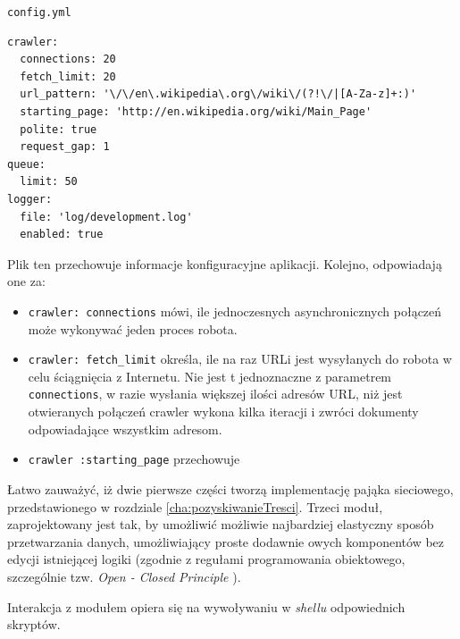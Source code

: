 \texttt{config.yml}

\lstset{language=ruby}
\begin{lstlisting}[frame=single]
crawler:
  connections: 20
  fetch_limit: 20
  url_pattern: '\/\/en\.wikipedia\.org\/wiki\/(?!\/|[A-Za-z]+:)'
  starting_page: 'http://en.wikipedia.org/wiki/Main_Page'
  polite: true
  request_gap: 1
queue:
  limit: 50
logger:
  file: 'log/development.log'
  enabled: true

\end{lstlisting}

Plik ten przechowuje informacje konfiguracyjne aplikacji. Kolejno, odpowiadają one za:
\begin{itemize}
\item \texttt{crawler: connections} mówi, ile jednoczesnych asynchronicznych połączeń może wykonywać jeden proces robota.
\item \texttt{crawler: fetch_limit} określa, ile na raz URLi jest wysyłanych do robota w celu ściągnięcia z Internetu. Nie jest t jednoznaczne z parametrem \texttt{connections}, 
w razie wysłania większej ilości adresów URL, niż jest otwieranych połączeń crawler wykona kilka iteracji i zwróci dokumenty odpowiadające wszystkim adresom.
\item \texttt{crawler :starting_page} przechowuje 
\end{itemize}


Łatwo zauważyć, iż dwie pierwsze części tworzą implementację pająka sieciowego, przedstawionego w rozdziale \ref{cha:pozyskiwanieTresci}. Trzeci moduł, 
zaprojektowany jest tak, by umożliwić możliwie najbardziej elastyczny sposób przetwarzania danych, umożliwiający proste dodawnie owych komponentów bez edycji 
istniejącej logiki (zgodnie z regułami programowania obiektowego, szczególnie tzw. \emph{Open - Closed Principle} \cite{ooPrinc}).

Interakcja z modułem opiera się na wywoływaniu w  \emph{shellu} odpowiednich skryptów. 
